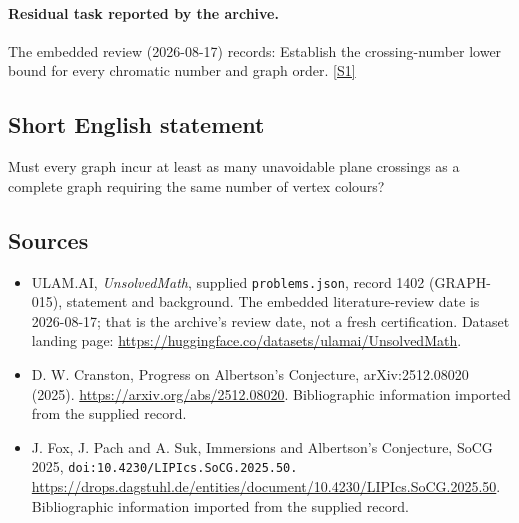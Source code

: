 \documentclass[11pt,a4paper]{article}
\newcommand{\sref}[2]{\hyperlink{source:#1:#2}{[S#2]}}
\begin{document}
\paragraph{Residual task reported by the archive.}

The embedded review (2026-08-17) records: Establish the crossing-number lower bound for every chromatic number and graph order. \sref{1402}{1}

\subsection{Short English statement}

Must every graph incur at least as many unavoidable plane crossings as a complete graph requiring the same number of vertex colours?

\subsection{Sources}

{\small

\begin{itemize}

\item[\hypertarget{source:1402:1}{S1}] ULAM.AI, \emph{UnsolvedMath}, supplied \texttt{problems.json}, record 1402 (GRAPH-015), statement and background. The embedded literature-review date is 2026-08-17; that is the archive’s review date, not a fresh certification. Dataset landing page: \url{https://huggingface.co/datasets/ulamai/UnsolvedMath}.

\item[\hypertarget{source:1402:2}{S2}] D. W. Cranston, Progress on Albertson's Conjecture, arXiv:2512.08020 (2025). \url{https://arxiv.org/abs/2512.08020}. Bibliographic information imported from the supplied record.

\item[\hypertarget{source:1402:3}{S3}] J. Fox, J. Pach and A. Suk, Immersions and Albertson's Conjecture, SoCG 2025, \nolinkurl{doi:10.4230/LIPIcs.SoCG.2025.50.} \url{https://drops.dagstuhl.de/entities/document/10.4230/LIPIcs.SoCG.2025.50}. Bibliographic information imported from the supplied record.

\end{itemize}

}

\label{end:1402}
\end{document}
